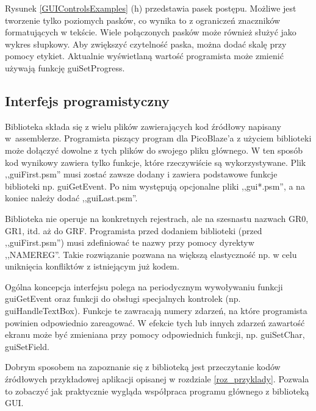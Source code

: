 Rysunek \ref{GUIControlsExamples} (h) przedstawia pasek postępu. Możliwe jest tworzenie tylko poziomych pasków, co wynika to z ograniczeń znaczników formatujących w tekście. Wiele połączonych pasków może również służyć jako wykres słupkowy. Aby zwiększyć czytelność paska, można dodać skalę przy pomocy etykiet. Aktualnie wyświetlaną wartość programista może zmienić używają funkcję {\ttfamily guiSetProgress}.

\subsection{Interfejs programistyczny}

Biblioteka składa się z wielu plików zawierających kod źródłowy napisany w~assemblerze. Programista piszący program dla PicoBlaze'a z użyciem biblioteki może dołączyć dowolne z tych plików do swojego pliku głównego. W ten sposób kod wynikowy zawiera tylko funkcje, które rzeczywiście są wykorzystywane. Plik ,,guiFirst.psm'' musi zostać zawsze dodany i zawiera podstawowe funkcje biblioteki np. {\ttfamily guiGetEvent}. Po nim występują opcjonalne pliki ,,gui*.psm'', a na koniec należy dodać ,,guiLast.psm''.

Biblioteka nie operuje na konkretnych rejestrach, ale na szesnastu nazwach GR0, GR1, itd. aż do GRF. Programista przed dodaniem biblioteki (przed ,,guiFirst.psm'') musi zdefiniować te nazwy przy pomocy dyrektyw ,,NAMEREG''. Takie rozwiązanie pozwana na większą elastyczność np. w celu uniknięcia konfliktów z istniejącym już kodem.

Ogólna koncepcja interfejsu polega na periodycznym wywoływaniu funkcji {\ttfamily guiGetEvent} oraz funkcji do obsługi specjalnych kontrolek (np. {\ttfamily guiHandleTextBox}). Funkcje te zawracają numery zdarzeń, na które programista powinien odpowiednio zareagować. W efekcie tych lub innych zdarzeń zawartość ekranu może być zmieniana przy pomocy odpowiednich funkcji, np. {\ttfamily guiSetChar}, {\ttfamily guiSetField}.

Dobrym sposobem na zapoznanie się z biblioteką jest przeczytanie kodów źródłowych przykładowej aplikacji opisanej w rozdziale \ref{roz_przyklady}. Pozwala to zobaczyć jak praktycznie wygląda współpraca programu głównego z biblioteką GUI.

